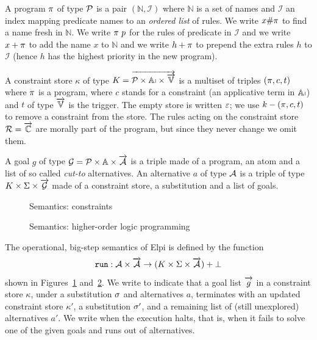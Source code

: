 \documentclass{these-ISSS}
\begin{document}
A program ${\pi}$ of type $\mathcal{P}$ is a pair $(\mathbb{N}, \mathcal{I})$
where $\mathbb{N}$ is a set of names and $\mathcal{I}$ an index
mapping predicate names to an \emph{ordered list} of rules.
We write $x \# {\pi}$ to find a name fresh in $\mathbb{N}$.
We write ${\pi}~p$ for the rules of predicate \pred in $\mathcal{I}$
and we write $x + {\pi}$ to add the name $x$ to $\mathbb{N}$
and we write $h + {\pi}$ to prepend the extra rules $h$  to $\mathcal{I}$
(hence $h$ has the highest priority in the new program).


A constraint store $\kappa$ of type $K = \vecL{\PROG \times \APP \times \vecL{\VAR}}$
is a multiset of triples $({\pi},c,t)$
where ${\pi}$ is a program, where $c$ stands for a constraint (an applicative term in $\mathbb{Ap}$) and $t$
of type $\vecL{\VAR}$ is the trigger. The empty store is written $\varepsilon$;
we use $k - ({\pi},c,t)$ to remove a constraint from the store.
The rules acting on the constraint store $\mathcal{R = \vecL{\mathbb{C}}}$ are
morally part of the program, but since they never change we omit them.


A goal $g$ of type $\g = \PROG \times \ATOM \times \vecL{\alt}$
is a triple made of a program, an atom and a list of
so called \emph{cut-to} alternatives.
An alternative $a$ of type $\mathcal{A}$ is a triple of type $K \times \Sigma \times \vecL{\g}$
made of a constraint store, a substitution and a list of goals.

\begin{figure}[p]
    \centering

  \caption{Semantics: constraints}
    \label{fig:basic-interp-c}
\end{figure}

  \begin{figure}[p]
  \centering
%


  
  \caption{Semantics: higher-order logic programming}
    \label{fig:basic-interp-l}
\end{figure}



The operational, big-step semantics of Elpi is defined by the function
$$
\run{} : \alt \times \vecL{\alt} \to (K  \times \Sigma \times \vecL{\alt}) + \bot
$$
shown in Figures~\cref{fig:basic-interp-c} and~\cref{fig:basic-interp-l}.
We write 
to indicate that a goal list $\vecL{g}$ in a constraint store $\kappa$, under a
substitution $\sigma$ and alternatives $a$, terminates with an updated
constraint store $\kappa'$, a substitution $\sigma'$, and a remaining list of
(still unexplored) alternatives $a'$. We write 
when the execution halts, that is, when it fails to solve one of the given goals
and runs out of alternatives.
\end{document}
